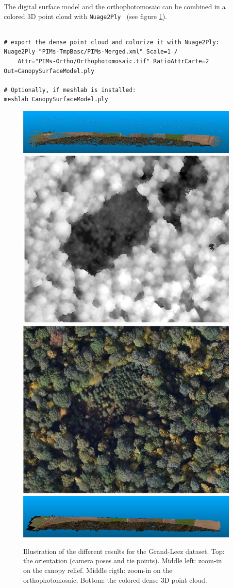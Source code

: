 The digital surface model and the orthophotomosaic can be combined in a colored 3D point cloud with  {\tt Nuage2Ply } (see figure \ref{fig:GL_nuage}).

\begin{verbatim}

# export the dense point cloud and colorize it with Nuage2Ply:
Nuage2Ply "PIMs-TmpBasc/PIMs-Merged.xml" Scale=1 /
	Attr="PIMs-Ortho/Orthophotomosaic.tif" RatioAttrCarte=2 Out=CanopySurfaceModel.ply
       
# Optionally, if meshlab is installed:
meshlab CanopySurfaceModel.ply
\end{verbatim}

\begin{figure}
\centering
\includegraphics[width=\linewidth]{FIGS/UASGrandLeez/GL_ori.jpg}
\includegraphics[width=0.49\linewidth]{FIGS/UASGrandLeez/GL_zoomDSM.jpeg}
\includegraphics[width=0.49\linewidth]{FIGS/UASGrandLeez/GL_zoomOrtho.jpeg}
\includegraphics[width=\linewidth]{FIGS/UASGrandLeez/GL_denseCloud.jpg}
\caption{Illustration of the different results for the Grand-Leez dataset. 
Top: the orientation (camera poses and tie points). 
Middle left: zoom-in on the canopy relief. 
Middle rigth: zoom-in on the orthophotomosaic.
Bottom: the colored dense 3D point cloud.}
\label{fig:GL_nuage}
\end{figure}



